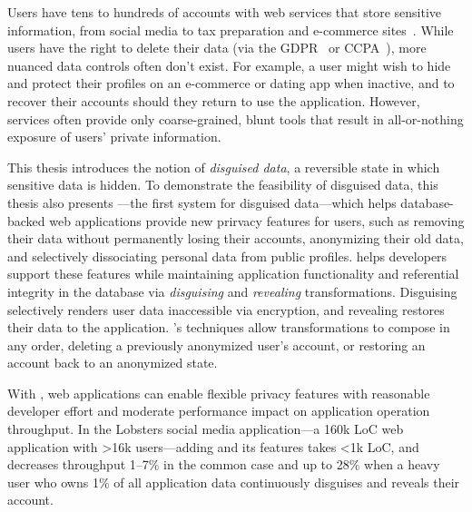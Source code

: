 Users have tens to hundreds of accounts with web services that store
sensitive information, from social media to tax preparation and e-commerce
sites~\cite{tens,hundreds,password_life_cycle}.
%
While users have the right to delete their data (via \eg the
GDPR~\cite{eu:gdpr} or CCPA~\cite{ccpa}), more nuanced
data controls often don't exist.
%
For example, a user might wish to hide and protect their profiles on an
e-commerce or dating app when inactive, and to recover their accounts should
they return to use the application. 
%
However, services often provide only coarse-grained, blunt tools that
result in all-or-nothing exposure of users’ private information.
%

%
This thesis introduces the notion of \emph{disguised data}, a reversible state
in which sensitive data is hidden.
%
To demonstrate the feasibility of disguised data, this thesis also presents
\sys---the first system for disguised data---which helps database-backed web
applications provide new prirvacy features for users, such as 
removing their data without permanently losing their accounts, anonymizing their
old data, and selectively dissociating personal data from public profiles.
%
\sys helps developers support these features while maintaining application
functionality and referential integrity in the database via \emph{disguising} and
\emph{revealing} transformations.
%
Disguising selectively renders user data inaccessible via encryption, and
revealing restores their data to the application.
%
\sys's techniques allow transformations to compose in any order, \eg deleting a
previously anonymized user's account, or restoring an account back to an
anonymized state.
%

%
With \sys, web applications can enable flexible privacy features with reasonable
developer effort and moderate performance impact on application operation
throughput.
%
In the Lobsters social media application---a 160k LoC web application with >16k
users---adding \sys and its features takes <1k LoC, and decreases throughput
1--7\% in the common case and up to 28\% when a heavy user
who owns 1\% of all application data continuously disguises and reveals their
account.
%

%
